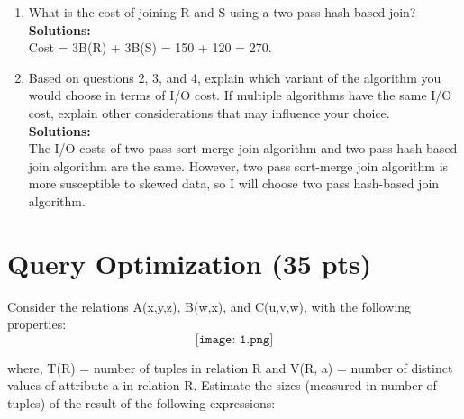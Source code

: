 \documentclass[paper=a4, fontsize=11pt]{scrartcl}
\numberwithin{equation}{section}		%
\numberwithin{figure}{section}			%
\numberwithin{table}{section}				%
\begin{document}
\begin{enumerate}
\begin{enumerate}
			\item What is the cost of joining R and S using a two pass hash-based join?\\
			\textbf{Solutions: }\\
			Cost = 3B(R) + 3B(S) = 150 + 120 = 270.
			
			\item Based on questions 2, 3, and 4, explain which variant of the algorithm you would choose in terms of I/O cost. If multiple algorithms have the same I/O cost, explain other considerations that may influence your choice.\\
			\textbf{Solutions: }\\
			The I/O costs of two pass sort-merge join algorithm and two pass hash-based join algorithm are the same. However, two pass sort-merge join algorithm is more susceptible to skewed data, so I will choose two pass hash-based join algorithm.
			
		\end{enumerate}
		
	\end{enumerate}
	
	
	\section{Query Optimization (35 pts)}
	
	Consider the relations A(x,y,z), B(w,x), and C(u,v,w), with the following properties:
	\[
	\texttt{[image: 1.png]}
	\]
	
	where, T(R) = number of tuples in relation R and V(R, a) = number of distinct values of attribute a in relation R. Estimate the sizes (measured in number of tuples) of the result of the following expressions:
	
\end{document}
